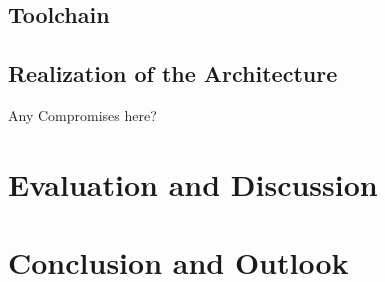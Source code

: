 \documentclass[language=english,noinputenc]{wiwwuwordrprt}
\begin{document}
    \section{Toolchain} %
    \label{sec:toolchain}
    

    \section{Realization of the Architecture} %
    \label{sec:realization_of_the_architecture}
    Any Compromises here?
  

  \chapter{Evaluation and Discussion} %
  \label{cha:evaluation}
  

  \chapter{Conclusion and Outlook} %
  \label{cha:conclusion_and_outlook}
  
\end{document}
